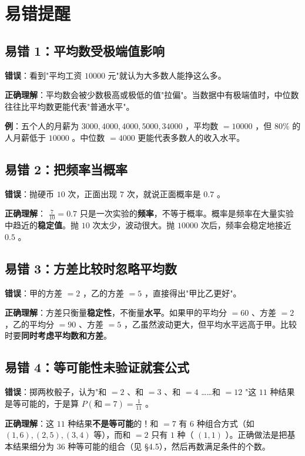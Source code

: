\section*{易错提醒}


\subsection*{易错 1：平均数受极端值影响}


\textbf{错误}：看到"平均工资 $10000$ 元"就认为大多数人能挣这么多。

\textbf{正确理解}：平均数会被少数极高或极低的值"拉偏"。当数据中有极端值时，中位数往往比平均数更能代表"普通水平"。

\textbf{例}：五个人的月薪为 $3000, 4000, 4000, 5000, 34000$ ，平均数 $= 10000$ ，但 $80\%$ 的人月薪低于 $10000$ 。中位数 $= 4000$ 更能代表多数人的收入水平。

\subsection*{易错 2：把频率当概率}


\textbf{错误}：抛硬币 $10$ 次，正面出现 $7$ 次，就说正面概率是 $0.7$ 。

\textbf{正确理解}： $\frac{7}{10} = 0.7$ 只是一次实验的\textbf{频率}，不等于概率。概率是频率在大量实验中趋近的\textbf{稳定值}。抛 $10$ 次太少，波动很大。抛 $10000$ 次后，频率会稳定地接近 $0.5$ 。

\subsection*{易错 3：方差比较时忽略平均数}


\textbf{错误}：甲的方差 $= 2$ ，乙的方差 $= 5$ ，直接得出"甲比乙更好"。

\textbf{正确理解}：方差只衡量\textbf{稳定性}，不衡量\textbf{水平}。如果甲的平均分 $= 60$ 、方差 $= 2$ ，乙的平均分 $= 90$ 、方差 $= 5$ ，乙虽然波动更大，但平均水平远高于甲。比较时要\textbf{同时考虑平均数和方差}。

\subsection*{易错 4：等可能性未验证就套公式}


\textbf{错误}：掷两枚骰子，认为"和 $= 2$ 、和 $= 3$ 、和 $= 4$ ……和 $= 12$ "这 $11$ 种结果是等可能的，于是算 $P(\text{和}=7) = \frac{1}{11}$ 。

\textbf{正确理解}：这 $11$ 种结果\textbf{不是等可能}的！和 $= 7$ 有 $6$ 种组合方式（如 $(1,6), (2,5), (3,4)$ 等），而和 $= 2$ 只有 $1$ 种（ $(1,1)$ ）。正确做法是把基本结果细分为 $36$ 种等可能的组合（见 §4.5），然后再数满足条件的个数。

